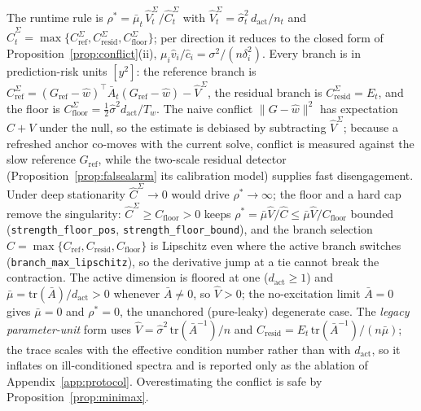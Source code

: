 \begin{remark}
The runtime rule is $\rho^* = \bar\mu_t\,\widehat V^\Sigma_t/\widehat C^\Sigma_t$ with $\widehat V^\Sigma_t = \widehat\sigma^2_t\,d_{\mathrm{act}}/n_t$ and $\widehat C^\Sigma_t = \max\{C^\Sigma_{\mathrm{ref}}, C^\Sigma_{\mathrm{resid}}, C^\Sigma_{\mathrm{floor}}\}$; per direction it reduces to the closed form of Proposition~\ref{prop:conflict}(ii), $\mu_i \hat v_i/\hat c_i = \sigma^2/(n\delta_i^2)$.
Every branch is in prediction-risk units $[y^2]$: the reference branch is $C^\Sigma_{\mathrm{ref}} = (G_{\mathrm{ref}} - \widehat w)^\top \bar A_t (G_{\mathrm{ref}} - \widehat w) - \widehat V^\Sigma$, the residual branch is $C^\Sigma_{\mathrm{resid}} = E_t$, and the floor is $C^\Sigma_{\mathrm{floor}} = \tfrac12 \widehat\sigma^2 d_{\mathrm{act}}/T_w$.
The naive conflict $\|G - \widehat w\|^2$ has expectation $C + V$ under the null, so the estimate is debiased by subtracting $\widehat V^\Sigma$; because a refreshed anchor co-moves with the current solve, conflict is measured against the slow reference $G_{\mathrm{ref}}$, while the two-scale residual detector (Proposition~\ref{prop:falsealarm} its calibration model) supplies fast disengagement.
Under deep stationarity $\widehat C^\Sigma \to 0$ would drive $\rho^* \to \infty$; the floor and a hard cap remove the singularity: $\widehat C^\Sigma \ge C_{\mathrm{floor}} > 0$ keeps $\rho^* = \bar\mu\widehat V/\widehat C \le \bar\mu\widehat V/C_{\mathrm{floor}}$ bounded (\texttt{strength\_floor\_pos}, \texttt{strength\_floor\_bound}), and the branch selection $\widehat C = \max\{C_{\mathrm{ref}}, C_{\mathrm{resid}}, C_{\mathrm{floor}}\}$ is Lipschitz even where the active branch switches (\texttt{branch\_max\_lipschitz}), so the derivative jump at a tie cannot break the contraction. The active dimension is floored at one ($d_{\mathrm{act}} \ge 1$) and $\bar\mu = \mathrm{tr}(\bar A)/d_{\mathrm{act}} > 0$ whenever $\bar A \ne 0$, so $\widehat V > 0$; the no-excitation limit $\bar A = 0$ gives $\bar\mu = 0$ and $\rho^* = 0$, the unanchored (pure-leaky) degenerate case.
The \emph{legacy parameter-unit} form uses $\widehat V = \widehat\sigma^2\,\mathrm{tr}(\bar A^{-1})/n$ and $C_{\mathrm{resid}} = E_t\,\mathrm{tr}(\bar A^{-1})/(n\bar\mu)$; the trace scales with the effective condition number rather than with $d_{\mathrm{act}}$, so it inflates on ill-conditioned spectra and is reported only as the ablation of Appendix~\ref{app:protocol}.
Overestimating the conflict is safe by Proposition~\ref{prop:minimax}.
\end{remark}

